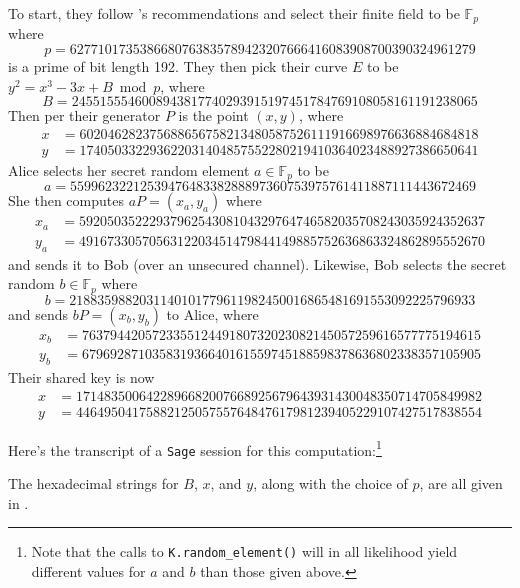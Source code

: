 \begin{ex}
To start, they follow \cite{gallagher09fipspub}'s recommendations and select
    their finite field to be $\mathbb{F}_p$ where
\[
p =  6277101735386680763835789423207666416083908700390324961279
\]
    is a prime of bit length 192.
They then pick their curve $E$ to be $y^2 = x^3 - 3x + B \bmod p$, where
\[
B = 2455155546008943817740293915197451784769108058161191238065
\]
Then per \cite{gallagher09fipspub} their generator $P$ is the point $(x, y)$,
    where
\begin{align*}
x &= 602046282375688656758213480587526111916698976636884684818\\
y &= 174050332293622031404857552280219410364023488927386650641
\end{align*}
Alice selects her secret random element $a \in \mathbb{F}_p$ to be
\[
a = 5599623221253947648338288897360753975761411887111443672469
\]
She then computes $a P = (x_a, y_a)$ where
\begin{align*}
x_a &= 5920503522293796254308104329764746582035708243035924352637\\
y_a &= 4916733057056312203451479844149885752636863324862895552670
\end{align*}
    and sends it to Bob (over an unsecured channel).
Likewise, Bob selects the secret random $b \in \mathbb{F}_p$ where
\[
b = 2188359882031140101779611982450016865481691553092225796933
\]
    and sends $b P = (x_b, y_b)$ to Alice, where
\begin{align*}
x_b &= 763794420572335512449180732023082145057259616577775194615\\
y_b &= 679692871035831936640161559745188598378636802338357105905
\end{align*}
Their shared key is now
\begin{align*}
x   &=  1714835006422896682007668925679643931430048350714705849982\\
y   &=  4464950417588212505755764847617981239405229107427517838554
\end{align*}

Here's the transcript of a \texttt{Sage} session for this
    computation:\footnote{Note that the calls to \texttt{K.random\_element()}
    will in all likelihood yield different values for $a$ and $b$ than those
    given above.}

The hexadecimal strings for $B$, $x$, and $y$, along with the choice of $p$,
    are all given in \cite{gallagher09fipspub}.
\end{ex}

